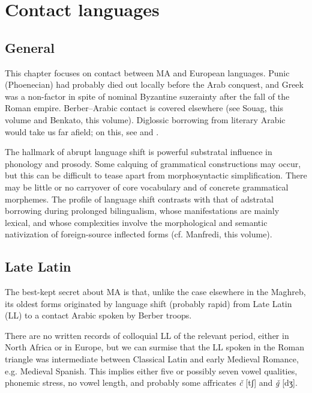 \documentclass[output=paper]{langsci/langscibook}
\begin{document}
\section{Contact languages}

\subsection{General}

This chapter focuses on contact between MA and European languages. Punic (Phoenecian) had probably died out locally before the Arab conquest, and Greek was a non-factor in spite of nominal Byzantine suzerainty after the fall of the Roman empire. Berber–Arabic contact is covered elsewhere (see Souag, this volume and Benkato, this volume). Diglossic borrowing from literary Arabic would take us far afield; on this, see \citet{Sayahi2014} and \citet{Heath1989}.

The hallmark of abrupt language shift is powerful substratal influence in phonology and prosody. Some calquing of grammatical constructions may occur, but this can be difficult to tease apart from morphosyntactic simplification. There may be little or no carryover of core vocabulary and of concrete grammatical morphemes. The profile of language shift contrasts with that of adstratal borrowing during prolonged bilingualism, whose manifestations are mainly lexical, and whose complexities involve the morphological and semantic nativization of foreign-source inflected forms (cf. Manfredi, this volume).

\subsection{Late Latin}

The best-kept secret about MA is that, unlike the case elsewhere in the Maghreb, its oldest forms originated by language shift (probably rapid) from Late Latin (LL) to a contact Arabic spoken by Berber troops.

There are no written records of colloquial LL of the relevant period, either in North Africa or in Europe, but we can surmise that the LL spoken in the Roman triangle was intermediate between Classical Latin and early Medieval Romance, e.g. Medieval Spanish. This implies either five or possibly seven vowel qualities, phonemic stress, no vowel length, and probably some affricates \textit{č} [tʃ] and \textit{ǧ} [dʒ].
\end{document}
